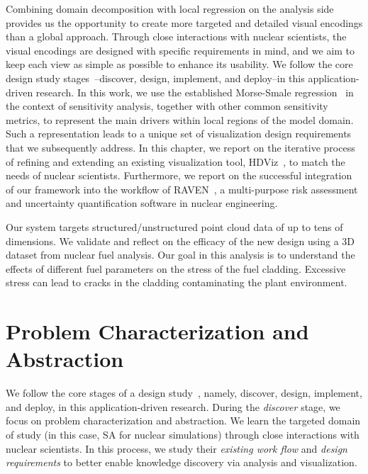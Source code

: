 Combining domain decomposition with local regression on the analysis side provides us the opportunity to create more targeted and detailed visual encodings than a global approach.
%
Through close interactions with nuclear scientists, the visual encodings are designed with specific requirements in mind, and we aim to keep each view as simple as possible to enhance its usability.
%
We follow the core design study stages~\cite{SedlmairMeyerMunzner2012}--discover, design, implement, and deploy--in this application-driven research.
%
In this work, we use the established Morse-Smale regression~\cite{GerberRubelBremer2011} in the context of sensitivity analysis, together with other common sensitivity metrics, to represent the main drivers within local regions of the model domain.
%
Such a representation leads to a unique set of visualization design requirements that we subsequently address.
%
In this chapter, we report on the iterative process of refining and extending an existing visualization tool, HDViz~\cite{GerberBremerPascucci2010}, to match the needs of nuclear scientists.
%
Furthermore, we report on the successful integration of our framework into the workflow of RAVEN~\cite{RabitiAlfonsiCogliati2015}, a multi-purpose risk assessment and uncertainty quantification software in nuclear engineering.

Our system targets structured/unstructured point cloud data of up to tens of dimensions.
%
We validate and reflect on the efficacy of the new design using a 3D dataset from nuclear fuel analysis.
%
Our goal in this analysis is to understand the effects of different fuel parameters on the stress of the fuel cladding.
%
Excessive stress can lead to cracks in the cladding contaminating the plant environment.

\section{Problem Characterization and Abstraction}
\label{sec:currentWorkflow}
We follow the core stages of a design study~\cite{SedlmairMeyerMunzner2012}, namely, discover, design, implement, and deploy, in this application-driven research.
%
During the \emph{discover} stage, we focus on problem characterization and abstraction.
%
We learn the targeted domain of study (in this case, SA for nuclear simulations) through close interactions with nuclear scientists.
%
In this process, we study their \emph{existing work flow} and \emph{design requirements} to better enable knowledge discovery via analysis and visualization.

